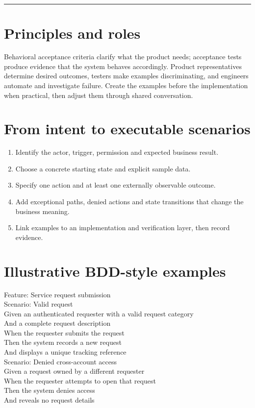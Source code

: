 \documentclass[11pt,letterpaper]{article}
\begin{document}
\tableofcontents\medskip\noindent\rule{\linewidth}{0.4pt}\medskip
\section{Principles and roles}
Behavioral acceptance criteria clarify what the product needs; acceptance tests produce evidence that the system behaves accordingly. Product representatives determine desired outcomes, testers make examples discriminating, and engineers automate and investigate failure. Create the examples before the implementation when practical, then adjust them through shared conversation.

\section{From intent to executable scenarios}
\begin{enumerate}[leftmargin=*,itemsep=3pt]
\item Identify the actor, trigger, permission and expected business result.
\item Choose a concrete starting state and explicit sample data.
\item Specify one action and at least one externally observable outcome.
\item Add exceptional paths, denied actions and state transitions that change the business meaning.
\item Link examples to an implementation and verification layer, then record evidence.
\end{enumerate}
\section{Illustrative BDD-style examples}
\begin{tcolorbox}[colback=grayback,colframe=navy,title={Original example scenarios},breakable]
\ttfamily\small
Feature: Service request submission\\
Scenario: Valid request\\
Given an authenticated requester with a valid request category\\
And a complete request description\\
When the requester submits the request\\
Then the system records a new request\\
And displays a unique tracking reference\\[4pt]
Scenario: Denied cross-account access\\
Given a request owned by a different requester\\
When the requester attempts to open that request\\
Then the system denies access\\
And reveals no request details
\end{tcolorbox}
\end{document}
